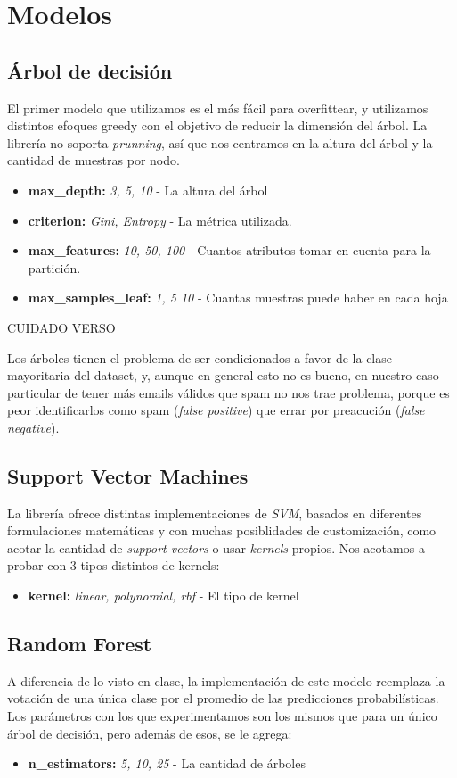 \section{Modelos}
\subsection{Árbol de decisión}
El primer modelo que utilizamos es el más fácil para overfittear, y utilizamos distintos efoques greedy con el objetivo de reducir la dimensión del árbol.
La librería no soporta \textit{prunning}, así que nos centramos en la altura del árbol y la cantidad de muestras por nodo.
\begin{itemize}
\item \textbf{max\_depth:} \textit{3, 5, 10} - La altura del árbol
\item \textbf{criterion:} \textit{Gini, Entropy} - La métrica utilizada.
\item \textbf{max\_features:} \textit{10, 50, 100} - Cuantos atributos tomar en cuenta para la partición.
\item \textbf{max\_samples\_leaf:} \textit{1, 5 10} - Cuantas muestras puede haber en cada hoja
\end{itemize}
{\Large CUIDADO VERSO}

Los árboles tienen el problema de ser condicionados a favor de la clase mayoritaria del dataset, y, aunque en general esto no es bueno,
en nuestro caso particular de tener más emails válidos que spam no nos trae problema, porque es peor identificarlos como spam (\textit{false positive}) que errar por preacución (\textit{false negative}).

\subsection{Support Vector Machines}
La librería ofrece distintas implementaciones de \textit{SVM}, basados en diferentes formulaciones matemáticas y con muchas posiblidades de customización,
como acotar la cantidad de \textit{support vectors} o usar \textit{kernels} propios. Nos acotamos a probar con 3 tipos distintos de kernels:
\begin{itemize}
\item \textbf{kernel:} \textit{linear, polynomial, rbf} - El tipo de kernel
\end{itemize}

\subsection{Random Forest}
A diferencia de lo visto en clase, la implementación de este modelo reemplaza la votación de una única clase por el promedio de las predicciones probabilísticas.
 Los parámetros con los que experimentamos son los mismos que para un único árbol de decisión, pero además de esos, se le agrega:
\begin{itemize}
\item \textbf{n\_estimators:} \textit{5, 10, 25} - La cantidad de árboles
\end{itemize}

